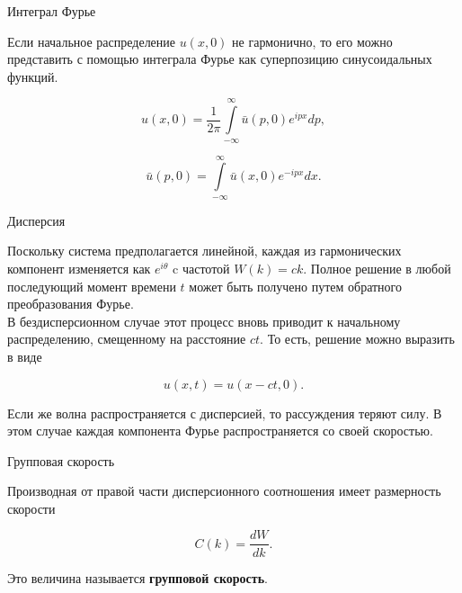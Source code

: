 \documentclass[10pt,xcolor=pst,aspectratio=169]{beamer}
\begin{document}
\begin{frame}{Интеграл Фурье}

    \transdissolve[duration=0.1]
    \justifying
    \large

    Если начальное распределение $u \left( x, 0 \right)$ не гармонично, то его можно представить с помощью интеграла Фурье как суперпозицию синусоидальных функций.

    \[
        u \left( x, 0 \right) = \frac{1}{2 \pi} \int\limits_{-\infty}^{\infty} \bar{u} \left( p, 0 \right) e^{i p x} dp ,
    \]

    \[
        \bar{u} \left( p, 0 \right) = \int\limits_{-\infty}^{\infty} \bar{u} \left( x, 0 \right) e^{- i p x} dx .
    \]

\end{frame}

\begin{frame}{Дисперсия}

    \transdissolve[duration=0.1]
    \justifying
    \large

    Поскольку система предполагается линейной, каждая из гармонических компонент изменяется как $e^{i \theta}$ c частотой $W \left( k \right) = c k$. Полное решение в любой последующий момент времени $t$ может быть получено путем обратного преобразования Фурье.\\

    В бездисперсионном случае этот процесс вновь приводит к начальному распределению, смещенному на расстояние $c t$. То есть, решение можно выразить в виде

    \[
        u \left( x, t \right) = u \left( x - c t, 0 \right).
    \]

Если же волна распространяется с дисперсией, то рассуждения теряют силу. В этом случае каждая компонента Фурье распространяется со своей скоростью.

\end{frame}

\begin{frame}{Групповая скорость}

    \transdissolve[duration=0.1]
    \justifying
    \large

    Производная от правой части дисперсионного соотношения имеет размерность скорости

    \[
        C \left( k \right) = \frac{d W}{d k}.
    \]

    Это величина называется \textbf{групповой скорость}.

\end{frame}
\end{document}
